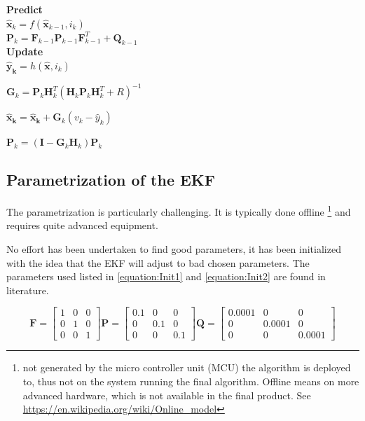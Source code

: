 \textbf{Predict} \\

$\hat{\boldsymbol x}_k = f( \hat{\boldsymbol x}_{k-1}, {i}_{k})$ \\


$\boldsymbol P_k = \boldsymbol F_{k-1} \boldsymbol P_{k-1} \boldsymbol F^T_{k-1} + \boldsymbol Q_{k-1}$ \\

\textbf{Update} \\ 

$\boldsymbol {\hat{y}_k} = h( \hat{\boldsymbol x},i_k) $ %


$\boldsymbol G_k = \boldsymbol P_k \boldsymbol H^T_k (\boldsymbol H_k \boldsymbol P_k \boldsymbol H^T_k +  R)^{-1}$

$\boldsymbol {\hat{x}_k} = \boldsymbol  {\hat{x}_k} + \boldsymbol G_k(v_k - \hat{y}_k)$
 

$\boldsymbol P_k = (\boldsymbol I - \boldsymbol G_k \boldsymbol H_k) \boldsymbol P_k$ \\



\subsection{Parametrization of the EKF}
\label{Parametrization}

The parametrization is particularly challenging. It is typically done offline \footnote{not generated by the micro controller unit (MCU) the algorithm is deployed to, thus not on the system running the final algorithm. Offline means on more advanced hardware, which is not available in the final product. See \url{https://en.wikipedia.org/wiki/Online_model} } and requires quite advanced equipment.

No effort has been undertaken to find good parameters, it has been initialized with the idea that the EKF will adjust to bad chosen parameters. The parameters used listed in \ref{equation:Init1} and \ref{equation:Init2} are found in literature. %

\begin{equation}
 \boldsymbol F= 
 \begin{bmatrix}
 1 & 0 & 0\\
 0 & 1 & 0\\
 0 & 0 & 1
 \end{bmatrix} 
 \boldsymbol P= 
 \begin{bmatrix}
 0.1 & 0 & 0\\
 0 & 0.1 & 0\\
 0 & 0 & 0.1
 \end{bmatrix}
  \boldsymbol Q= 
  \begin{bmatrix}
  0.0001 & 0 & 0\\
  0 & 0.0001 & 0\\
  0 & 0 & 0.0001
  \end{bmatrix}
\label{equation:Init1} 
\end{equation} 

